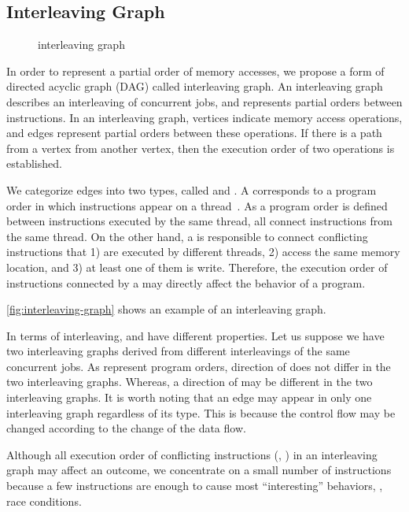 \subsection{Interleaving Graph}
\label{ss:coverage}

\begin{figure}[t]
  \caption{interleaving graph}
  \label{fig:interleaving-graph}
\end{figure}

In order to represent a partial order of memory accesses, we propose a
form of directed acyclic graph (DAG) called interleaving graph.
%
An interleaving graph describes an interleaving of concurrent jobs,
and represents partial orders between instructions.
%
In an interleaving graph, vertices indicate memory access operations,
and edges represent partial orders between these operations.
%
If there is a path from a vertex from another vertex, then the
execution order of two operations is established.

We categorize edges into two types, called \immutables and \mutables.
%
A \immutable corresponds to a program order in which instructions
appear on a thread~\cite{frightening, lkmm}. As a program order is
defined between instructions executed by the same thread, all
\immutables connect instructions from the same thread.
%
On the other hand, a \mutable is responsible to connect conflicting
instructions that 1) are executed by different threads, 2) access the
same memory location, and 3) at least one of them is write.
%
Therefore, the execution order of instructions connected by a \mutable
may directly affect the behavior of a program.


\autoref{fig:interleaving-graph} shows an example of an interleaving
graph.
%


%
In terms of interleaving, \immutables and \mutables have different
properties. Let us suppose we have two interleaving graphs derived
from different interleavings of the same concurrent jobs.
%
As \immutables represent program orders, direction of \immutables does
not differ in the two interleaving graphs.
%
Whereas, a direction of \mutables may be different in the two
interleaving graphs.
%
It is worth noting that an edge may appear in only one interleaving
graph regardless of its type. This is because the control flow may be
changed according to the change of the data flow.


%
Although all execution order of conflicting instructions (\ie,
\mutables) in an interleaving graph may affect an outcome, we
concentrate on a small number of instructions because a few
instructions are enough to cause most ``interesting'' behaviors, \ie,
race conditions.

